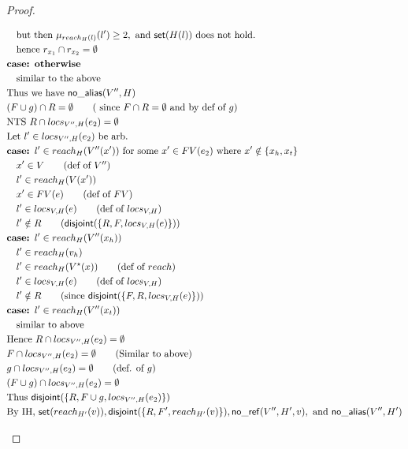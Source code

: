 \documentclass[11pt]{article}
\newcommand{\ms}[1]{\ensuremath{\mathsf{#1}}}
\newcommand{\na}[1]{\mathsf{no\_alias}(#1)}
\newcommand{\nr}[1]{\mathsf{no\_ref}(#1)}
\newcommand{\dist}[1]{\mathsf{disjoint}(#1)}
\begin{document}
\begin{proof}
\begin{description}
\begin{align*}
  &\quad \text{but then } \mu_{reach_H(l)}(l') \ge 2, \text{ and } \ms{set}(H(l)) \text{ does not hold}.\\
  &\quad \text{hence } r_{x_1} \cap r_{x_2} = \emptyset\\
  & \textbf{case: otherwise} \\
  &\quad \text{similar to the above}\\
  &\text{Thus we have } \na{V'',H}\\
  &(F \cup g) \cap R = \emptyset \tag{ since $F \cap R = \emptyset$ and by def of $g$}\\
  &\text{NTS } R \cap locs_{V'',H}(e_2) = \emptyset\\
  &\text{Let } l' \in locs_{V'',H}(e_2) \text{ be arb.}\\
  &\textbf{case: }  l' \in reach_{H}(V''(x')) \text{ for some $x' \in FV(e_2)$ where } x' \notin \{x_h,x_t\}\\
  &\quad x' \in V \tag{def of $V''$}\\
  &\quad l' \in reach_{H}(V(x'))\\
  &\quad x' \in FV(e) \tag{def of $FV$}\\
  &\quad l' \in locs_{V,H}(e) \tag{def of $locs_{V,H}$}\\
  &\quad l' \notin R \tag{$\dist{\{R,F,locs_{V,H}(e)\}}$}\\
  &\textbf{case: }  l' \in reach_{H}(V''(x_h)) \\
  &\quad l' \in reach_{H}(v_h)\\
  &\quad l' \in reach_{H}(V^{\star}(x)) \tag{def of $reach$}\\
  &\quad l' \in locs_{V,H}(e) \tag{def of $locs_{V,H}$}\\
  &\quad l' \notin R \tag{since $\dist{\{F,R,locs_{V,H}(e)\}}$}\\
  &\textbf{case: }  l' \in reach_{H}(V''(x_t)) \\
  &\quad \text{similar to above}\\
  &\text{Hence } R \cap locs_{V'',H}(e_2) = \emptyset\\
  &F \cap locs_{V'',H}(e_2) = \emptyset \tag{Similar to above}\\
  &g \cap locs_{V'',H}(e_2) = \emptyset \tag{def. of $g$}\\
  &(F \cup g) \cap locs_{V'',H}(e_2) = \emptyset\\
  &\text{Thus } \dist{\{R,F \cup g,locs_{V'',H}(e_2)\}}\\
  &\text{By IH, } \ms{set}(reach_{H'}(v)), \dist{\{R,F',reach_{H'}(v)\}}, \nr{V'',H',v}, \text{ and } \na{V'',H'}\\

\end{align*}
\end{description}
\end{proof}
\end{document}
